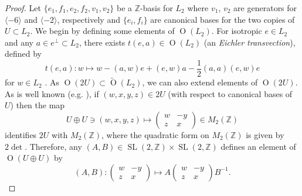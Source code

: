 \documentclass[11pt]{article}
\newcommand{\ZZ}{\mathbb{Z}}
\newcommand{\la}{\langle}
\newcommand{\ra}{\rangle}
\newcommand{\opn}{\operatorname}
\newcommand{\op}{\oplus}
\begin{document}
\begin{proof}
Let $\{e_1, f_1, e_2, f_2, v_1, v_2 \}$ be a $\ZZ$-basis for $L_2$ where $v_1$, $v_2$ are generators for $\la -6 \ra$ and $\la -2 \ra$, respectively and $\{e_i, f_i \}$ are canonical bases for the two copies of $U \subset L_2$.
We begin by defining some elements of $\opn{O}(L_2)$.
For isotropic $e \in L_2$  and any $a \in e^{\perp} \subset L_2$, there exists   $t(e,a) \in \opn{O}(L_2)$ (an \emph{Eichler transvection}), defined by
\begin{equation}\label{eichlertrans}
t(e, a) : w \mapsto w - (a,w)e + (e,w)a - \frac{1}{2}(a,a)(e,w)e
\end{equation}
for $w \in L_2$ \cite{eichler, abelianisation}.
As $\opn{O}(2U) \subset \widetilde{\opn{O}}(L_2)$, we can also extend elements of  $\opn{O}(2U)$.
As is well known (e.g. \cite{Sterk}), if $(w,x,y,z) \in 2U$ (with respect to  canonical bases of $U$) then the map
\begin{equation}\label{sliso}
U \op U \ni (w,x,y,z) \mapsto
\begin{pmatrix}
 w & -y \\
 z & x
\end{pmatrix} \in M_2(\ZZ) 
\end{equation}
identifies $2U$ with $M_2(\ZZ)$, where the quadratic form on $M_2(\ZZ)$ is given by $2 \opn{det}$.
Therefore, any $(A, B) \in \opn{SL}(2, \ZZ) \times \opn{SL}(2, \ZZ)$ defines an element of $\opn{O}(U \op U)$ by
\begin{equation}\label{O(2U)}
(A, B) :
\begin{pmatrix}
w & -y \\
z & x
\end{pmatrix}
\mapsto
A
\begin{pmatrix}
w & -y \\
z & x
\end{pmatrix}
B^{-1}.
\end{equation}


\end{proof}
\end{document}
